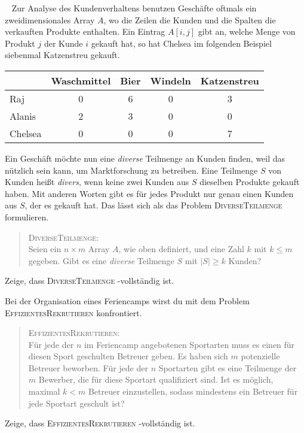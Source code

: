 \documentclass{uebung_cs}
\begin{document}
\begin{aufgabe}[Kundenanalyse]\
	Zur Analyse des Kundenverhaltens benutzen Geschäfte oftmals ein zweidimensionales Array $A$, wo die Zeilen die Kunden und die Spalten die verkauften Produkte enthalten. Ein Eintrag $A[i,j]$ gibt an, welche Menge von Produkt $j$ der Kunde $i$ gekauft hat, so hat Chelsea im folgenden Beispiel siebenmal Katzenstreu gekauft.
	
	\begin{center}
	\begin{tabular}{l c c c c}
	\hline 
	& Waschmittel & Bier & Windeln & Katzenstreu \\ 
	\hline 
	Raj & 0 & 6 & 0 & 3 \\ 
	Alanis & 2 & 3 & 0 & 0 \\ 
	Chelsea & 0 & 0 & 0 & 7 \\ 
	\hline 
	\end{tabular} 
	\end{center}
	
	Ein Geschäft möchte nun eine \textit{diverse} Teilmenge an Kunden finden, weil das nützlich sein kann, um Marktforschung zu betreiben. Eine Teilmenge $S$ von Kunden heißt \textit{divers}, wenn keine zwei Kunden aus $S$ dieselben Produkte gekauft haben. Mit anderen Worten gibt es für jedes Produkt nur genau einen Kunden aus $S$, der es gekauft hat. Das lässt sich als das Problem \textsc{DiverseTeilmenge} formulieren.
	\begin{quote}
		\textsc{DiverseTeilmenge}:\\
		Seien ein $n \times m$ Array $A$, wie oben definiert, und eine Zahl $k$ mit $k \leq m$ gegeben. Gibt es eine \textit{diverse} Teilmenge $S$ mit $|S| \geq k$ Kunden?
	\end{quote}
	Zeige, dass \textsc{DiverseTeilmenge} \NP-vollständig ist.
\end{aufgabe}    

\begin{aufgabe}[Feriencamp]
	Bei der Organisation eines Feriencamps wirst du mit dem Problem \textsc{EffizientesRekrutieren} konfrontiert.
	\begin{quote}
		\textsc{EffizientesRekrutieren}:\\
		Für jede der $n$ im Feriencamp angebotenen Sportarten muss es einen für diesen Sport geschulten Betreuer geben. Es haben sich $m$ potenzielle Betreuer beworben. Für jede der $n$ Sportarten gibt es eine Teilmenge der $m$ Bewerber, die für diese Sportart qualifiziert sind. Ist es möglich, maximal $k < m$ Betreuer einzustellen, sodass mindestens ein Betreuer für jede Sportart geschult ist?
	\end{quote}	 
	
	Zeige, dass \textsc{EffizientesRekrutieren} \NP-vollständig ist.
\end{aufgabe}
\end{document}
